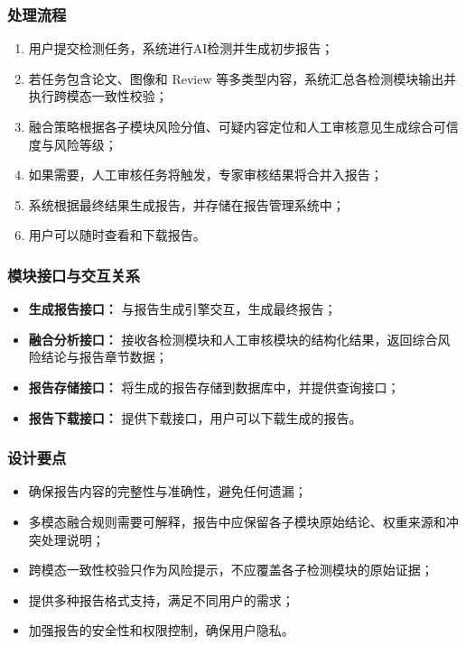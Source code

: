 \subsubsection{处理流程}
\begin{enumerate}[leftmargin=2em]
    \item 用户提交检测任务，系统进行AI检测并生成初步报告；
    \item 若任务包含论文、图像和 Review 等多类型内容，系统汇总各检测模块输出并执行跨模态一致性校验；
    \item 融合策略根据各子模块风险分值、可疑内容定位和人工审核意见生成综合可信度与风险等级；
    \item 如果需要，人工审核任务将触发，专家审核结果将合并入报告；
    \item 系统根据最终结果生成报告，并存储在报告管理系统中；
    \item 用户可以随时查看和下载报告。
\end{enumerate}

\subsubsection{模块接口与交互关系}
\begin{itemize}[leftmargin=2em]
    \item \textbf{生成报告接口：} 与报告生成引擎交互，生成最终报告；
    \item \textbf{融合分析接口：} 接收各检测模块和人工审核模块的结构化结果，返回综合风险结论与报告章节数据；
    \item \textbf{报告存储接口：} 将生成的报告存储到数据库中，并提供查询接口；
    \item \textbf{报告下载接口：} 提供下载接口，用户可以下载生成的报告。
\end{itemize}

\subsubsection{设计要点}
\begin{itemize}[leftmargin=2em]
    \item 确保报告内容的完整性与准确性，避免任何遗漏；
    \item 多模态融合规则需要可解释，报告中应保留各子模块原始结论、权重来源和冲突处理说明；
    \item 跨模态一致性校验只作为风险提示，不应覆盖各子检测模块的原始证据；
    \item 提供多种报告格式支持，满足不同用户的需求；
    \item 加强报告的安全性和权限控制，确保用户隐私。
\end{itemize}


